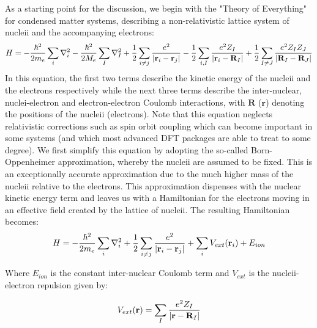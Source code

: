 \documentclass[10pt]{ruthesis}
\begin{document}
As a starting point for the discussion, we begin with the "Theory of Everything" for condensed matter systems, describing a non-relativistic lattice system of nucleii and the accompanying electrons:
\begin{equation}\label{DFT_1}
H=-\dfrac{\hbar^2}{2m_e}\sum_i\nabla_i^2  -\dfrac{\hbar^2}{2M_e}\sum_I\nabla_I^2 +\dfrac{1}{2}\sum_{i\neq j} \dfrac{e^2}{|\mathbf{r}_i -\mathbf{r}_j|}-\dfrac{1}{2}\sum_{i, I} \dfrac{e^2Z_I}{|\mathbf{r}_i -\mathbf{R}_I|} + \dfrac{1}{2}\sum_{I\neq J} \dfrac{e^2Z_I Z_J}{|\mathbf{R}_I -\mathbf{R}_J|} 
\end{equation}
In this equation, the first two terms describe the kinetic energy of the nucleii and the electrons respectively while the next three terms describe the inter-nuclear, nuclei-electron and electron-electron Coulomb interactions, with $\mathbf{R}$ ($\mathbf{r}$) denoting the positions of the nucleii (electrons). Note that this equation neglects relativistic corrections such as spin orbit coupling which can become important in some systems (and which most advanced DFT packages are able to treat to some degree). We first simplify this equation by adopting the so-called Born-Oppenheimer approximation, whereby the nucleii are assumed to be fixed. This is an exceptionally accurate approximation due to the much higher mass of the nucleii relative to the electrons. This approximation dispenses with the nuclear kinetic energy term and leaves us with a Hamiltonian for the electrons moving in an effective field created by the lattice of nucleii. The resulting Hamiltonian becomes:
\begin{equation}\label{DFT_2}
H=-\dfrac{\hbar^2}{2m_e}\sum_i\nabla_i^2 + \dfrac{1}{2}\sum_{i\neq j} \dfrac{e^2}{|\mathbf{r}_i -\mathbf{r}_j|} +\sum_i V_{ext}(\mathbf{r}_i) +E_{ion}
\end{equation}

Where $E_{ion}$ is the constant inter-nuclear Coulomb term and $V_{ext}$ is the nucleii-electron repulsion given by:

\begin{equation}
 V_{ext}(\mathbf{r})= \sum_{I} \dfrac{e^2 Z_I}{|\mathbf{r}-\mathbf{R}_I|}
 \end{equation} 
\end{document}
